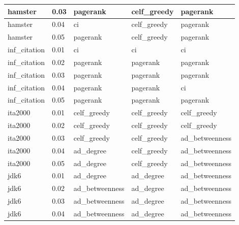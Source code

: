 \begin{longtable}[c]{|l|l|l|l|l|}
	hamster          & 0.03            & pagerank               & celf\_greedy           & pagerank            \\ \hline
	hamster          & 0.04            & ci                     & celf\_greedy           & pagerank            \\ \hline
	hamster          & 0.05            & pagerank               & celf\_greedy           & pagerank            \\ \hline
	inf\_citation    & 0.01            & ci                     & ci                     & ci                  \\ \hline
	inf\_citation    & 0.02            & pagerank               & pagerank               & pagerank            \\ \hline
	inf\_citation    & 0.03            & pagerank               & pagerank               & pagerank            \\ \hline
	inf\_citation    & 0.04            & pagerank               & pagerank               & ci                  \\ \hline
	inf\_citation    & 0.05            & pagerank               & pagerank               & pagerank            \\ \hline
	ita2000          & 0.01            & celf\_greedy           & celf\_greedy           & celf\_greedy        \\ \hline
	ita2000          & 0.02            & celf\_greedy           & celf\_greedy           & celf\_greedy        \\ \hline
	ita2000          & 0.03            & celf\_greedy           & celf\_greedy           & ad\_betweenness     \\ \hline
	ita2000          & 0.04            & ad\_degree             & celf\_greedy           & ad\_betweenness     \\ \hline
	ita2000          & 0.05            & ad\_degree             & celf\_greedy           & ad\_betweenness     \\ \hline
	jdk6             & 0.01            & ad\_degree             & ad\_degree             & ad\_betweenness     \\ \hline
	jdk6             & 0.02            & ad\_betweenness        & ad\_degree             & ad\_betweenness     \\ \hline
	jdk6             & 0.03            & ad\_betweenness        & ad\_degree             & ad\_betweenness     \\ \hline
	jdk6             & 0.04            & ad\_betweenness        & ad\_degree             & ad\_betweenness     \\ \hline

\end{longtable}
